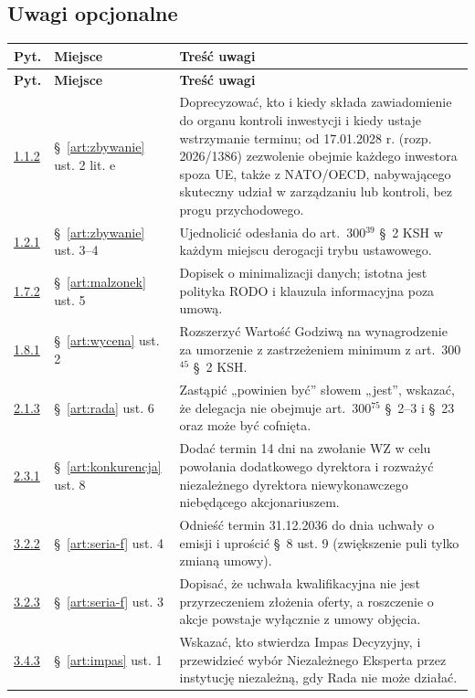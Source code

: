 \documentclass[12pt,a4paper]{report}
\begin{document}
\subsection*{Uwagi opcjonalne}
\begin{longtable}{@{}p{1.3cm} p{3.3cm} p{9.6cm}@{}}
\toprule
\textbf{Pyt.} & \textbf{Miejsce} & \textbf{Treść uwagi} \\
\midrule
\endfirsthead
\toprule
\textbf{Pyt.} & \textbf{Miejsce} & \textbf{Treść uwagi} \\
\midrule
\endhead
\hyperref[memo:1.1.2]{1.1.2} & §~\ref{art:zbywanie} ust. 2 lit. e & Doprecyzować, kto i kiedy składa zawiadomienie do organu kontroli inwestycji i kiedy ustaje wstrzymanie terminu; od 17.01.2028 r. (rozp. 2026/1386) zezwolenie obejmie każdego inwestora spoza UE, także z NATO/OECD, nabywającego skuteczny udział w zarządzaniu lub kontroli, bez progu przychodowego. \\
\hyperref[memo:1.2.1]{1.2.1} & §~\ref{art:zbywanie} ust. 3--4 & Ujednolicić odesłania do art.~300$^{39}$ §~2 KSH w każdym miejscu derogacji trybu ustawowego. \\
\hyperref[memo:1.7.2]{1.7.2} & §~\ref{art:malzonek} ust. 5 & Dopisek o minimalizacji danych; istotna jest polityka RODO i klauzula informacyjna poza umową. \\
\hyperref[memo:1.8.1]{1.8.1} & §~\ref{art:wycena} ust. 2 & Rozszerzyć Wartość Godziwą na wynagrodzenie za umorzenie z zastrzeżeniem minimum z art.~300$^{45}$ §~2 KSH. \\
\hyperref[memo:2.1.3]{2.1.3} & §~\ref{art:rada} ust. 6 & Zastąpić „powinien być” słowem „jest”, wskazać, że delegacja nie obejmuje art.~300$^{75}$ §~2--3 i §~23 oraz może być cofnięta. \\
\hyperref[memo:2.3.1]{2.3.1} & §~\ref{art:konkurencja} ust. 8 & Dodać termin 14 dni na zwołanie WZ w celu powołania dodatkowego dyrektora i rozważyć niezależnego dyrektora niewykonawczego niebędącego akcjonariuszem. \\
\hyperref[memo:3.2.2]{3.2.2} & §~\ref{art:seria-f} ust. 4 & Odnieść termin 31.12.2036 do dnia uchwały o emisji i uprościć §~8 ust. 9 (zwiększenie puli tylko zmianą umowy). \\
\hyperref[memo:3.2.3]{3.2.3} & §~\ref{art:seria-f} ust. 3 & Dopisać, że uchwała kwalifikacyjna nie jest przyrzeczeniem złożenia oferty, a roszczenie o akcje powstaje wyłącznie z umowy objęcia. \\
\hyperref[memo:3.4.3]{3.4.3} & §~\ref{art:impas} ust. 1 & Wskazać, kto stwierdza Impas Decyzyjny, i przewidzieć wybór Niezależnego Eksperta przez instytucję niezależną, gdy Rada nie może działać. \\

\end{longtable}
\end{document}
